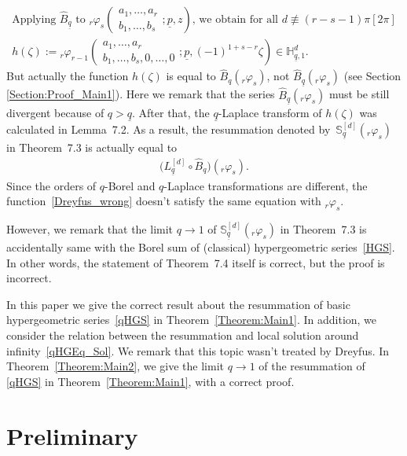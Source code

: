 \documentclass[pdftex]{sigma}
\numberwithin{equation}{section}
\begin{document}
\begin{gather*}
\text{Applying $\hat{B}_{\underline{q}}$ to ${}_r\varphi_s\left(
\begin{matrix}
a_1,\ldots,a_r\\
b_1,\ldots,b_s
\end{matrix};\underline{p},z
\right)$, we obtain for all $d\not\equiv(r-s-1)\pi[2\pi]$}\\
h(\zeta):={}_r\varphi_{r-1}\left(\begin{matrix}
a_1,\ldots,a_r\\
b_1,\ldots,b_s,0,\ldots,0
\end{matrix};\underline{p},(-1)^{1+s-r}\zeta
\right)\in\mathbb{H}_{\underline{q},1}^d.
\end{gather*}
But actually the function $h(\zeta)$ is equal to $\hat{B}_q ({}_r\varphi_s)$, not $\hat{B}_{\underline{q}} ({}_r\varphi_s)$ (see Section \ref{Section:Proof_Main1}). Here we remark that the series $\hat{B}_{\underline{q}} ({}_r\varphi_s)$ must be still divergent because of $q>\underline{q}$. After that, the $\underline{q}$-Laplace transform of $h(\zeta)$ was calculated in Lemma~7.2. As a result, the resummation denoted by~$\mathbb{S}_{\underline{q}}^{[d]}({}_r\varphi_s)$ in Theorem~7.3 is actually equal to
\begin{gather}\label{Dreyfus_wrong}
\big(L_{\underline{q}}^{[d]}\circ\hat{B}_{q}\big)({}_r\varphi_s).
\end{gather}
Since the orders of $q$-Borel and $q$-Laplace transformations are different, the function~\eqref{Dreyfus_wrong} doesn't satisfy the same equation with ${}_r\varphi_s$.

However, we remark that the limit $q\to1$ of $\mathbb{S}_{\underline{q}}^{[d]}({}_r\varphi_s)$ in Theorem~7.3 is accidentally same with the Borel sum of (classical) hypergeometric series~\eqref{HGS}. In other words, the statement of Theorem~7.4 itself is correct, but the proof is incorrect.

In this paper we give the correct result about the resummation of basic hypergeometric series~\eqref{qHGS} in Theorem~\ref{Theorem:Main1}. In addition, we consider the relation between the resummation and local solution around infinity~\eqref{qHGEq_Sol}. We remark that this topic wasn't treated by Dreyfus. In Theorem~\ref{Theorem:Main2}, we give the limit $q\to1$ of the resummation of \eqref{qHGS} in Theorem~\ref{Theorem:Main1}, with a correct proof.

\section{Preliminary}\label{Section:Preliminary}
\end{document}
